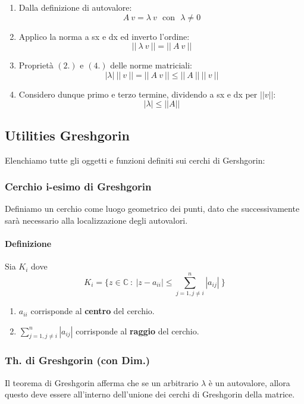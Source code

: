 \documentclass{article}
\begin{document}
\begin{enumerate}
    \item Dalla definizione di autovalore:
    \[ A\:v = \lambda\:v \:\:\: \text{con} \:\:\: \lambda \neq0\]
    \item Applico la norma a sx e dx ed inverto l'ordine:
    \[ ||\:\lambda\:v\:|| = ||\:A\:v\:||\]
    \item Proprietà $(2.)$ e $(4.)$ delle norme matriciali:
    \[ |\lambda|\:||\:v\:|| = ||\:A\:v \:|| \leq ||\:A\:|| \:||\:v\:|| \]
    \item Considero dunque primo e terzo termine, dividendo a sx e dx per $||v||$:
    \[ \boxed{|\lambda| \leq ||A||} \]
\end{enumerate}

\newpage

\subsection{Utilities Greshgorin}

Elenchiamo tutte gli oggetti e funzioni definiti sui cerchi di Gershgorin:

\subsubsection{Cerchio i-esimo di Greshgorin}

Definiamo un cerchio come luogo geometrico dei punti, dato che successivamente sarà necessario alla localizzazione degli autovalori.

\paragraph{Definizione} Sia $K_{i}$ dove
\[ \boxed{K_{i} = \{ z \in \mathbb{C} \: : \: |z-a_{ii}| \leq \sum_{j=1, j\neq i}^{n}|a_{ij}|  \: \} }\]

\begin{enumerate}
    \item $a_{ii}$ corrisponde al \textbf{centro} del cerchio.
    \item $\sum_{j=1, j\neq i}^{n}|a_{ij}|$ corrisponde al \textbf{raggio} del cerchio.
\end{enumerate}

\subsubsection{Th. di Greshgorin (con Dim.)}

Il teorema di Greshgorin afferma che se un arbitrario $\lambda$ è un autovalore, allora questo deve essere all'interno dell'unione dei cerchi di Greshgorin della matrice.
\end{document}
